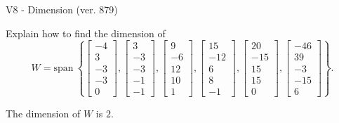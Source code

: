 \begin{exercise}
  \begin{exerciseTitle}V8 - Dimension (ver. 879)\end{exerciseTitle}
  \begin{exerciseStatement}
    Explain how to find the dimension of 
\[W=\mathrm{span}\ \left\{\left[\begin{array}{r}
-4 \\
3 \\
-3 \\
-3 \\
0
\end{array}\right] , \left[\begin{array}{r}
3 \\
-3 \\
-3 \\
-1 \\
-1
\end{array}\right] , \left[\begin{array}{r}
9 \\
-6 \\
12 \\
10 \\
1
\end{array}\right] , \left[\begin{array}{r}
15 \\
-12 \\
6 \\
8 \\
-1
\end{array}\right] , \left[\begin{array}{r}
20 \\
-15 \\
15 \\
15 \\
0
\end{array}\right] , \left[\begin{array}{r}
-46 \\
39 \\
-3 \\
-15 \\
6
\end{array}\right]\right\}.\]



  \end{exerciseStatement}
  \begin{exerciseAnswer}
   The dimension of \(W\) is  \(2\).
  


  \end{exerciseAnswer}
\end{exercise}